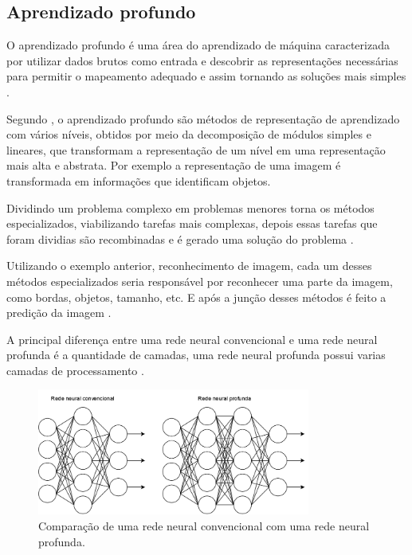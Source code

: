 \subsection{Aprendizado profundo}

O aprendizado profundo é uma área do aprendizado de máquina caracterizada por utilizar dados brutos como entrada e descobrir as representações necessárias para permitir o mapeamento adequado e assim tornando as soluções mais simples .

Segundo , o aprendizado profundo são métodos de representação de aprendizado com vários níveis, obtidos por meio da decomposição de módulos simples e lineares, que transformam a representação de um nível em uma representação mais alta e abstrata. Por exemplo a representação de uma imagem é transformada em informações que identificam objetos.

Dividindo um problema complexo em problemas menores torna os métodos especializados, viabilizando tarefas mais complexas, depois essas tarefas que foram dividias são recombinadas e é gerado uma solução do problema \cite{marti2017aprendizado}.

Utilizando o exemplo anterior, reconhecimento de imagem, cada um desses métodos especializados seria responsável por reconhecer uma parte da imagem, como bordas, objetos, tamanho, etc. E após a junção desses métodos é feito a predição da imagem \cite{marti2017aprendizado}.

A principal diferença entre uma rede neural convencional e uma rede neural profunda é a quantidade de camadas, uma rede neural profunda possui varias camadas de processamento .

\begin{figure}[H]
	\centering
	\includegraphics[width=0.8\textwidth]{figures/redes_neurais.png}
	\caption{Comparação de uma rede neural convencional com uma rede neural profunda.}	
	\label{fig:redes_neurais}
\end{figure}
